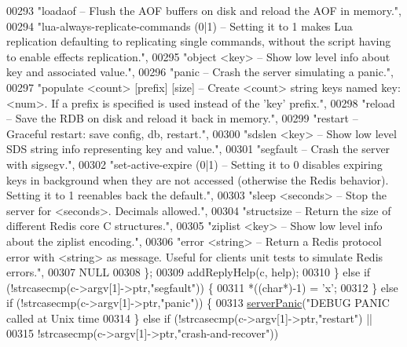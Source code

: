 \begin{DoxyCode}
{{{00293 \textcolor{stringliteral}{"loadaof -- Flush the AOF buffers on disk and reload the AOF in memory."},
00294 \textcolor{stringliteral}{"lua-always-replicate-commands (0|1) -- Setting it to 1 makes Lua replication defaulting to
       replicating single commands, without the script having to enable effects replication."},
00295 \textcolor{stringliteral}{"object <key> -- Show low level info about key and associated value."},
00296 \textcolor{stringliteral}{"panic -- Crash the server simulating a panic."},
00297 \textcolor{stringliteral}{"populate <count> [prefix] [size] -- Create <count> string keys named key:<num>. If a prefix is
       specified is used instead of the 'key' prefix."},
00298 \textcolor{stringliteral}{"reload -- Save the RDB on disk and reload it back in memory."},
00299 \textcolor{stringliteral}{"restart -- Graceful restart: save config, db, restart."},
00300 \textcolor{stringliteral}{"sdslen <key> -- Show low level SDS string info representing key and value."},
00301 \textcolor{stringliteral}{"segfault -- Crash the server with sigsegv."},
00302 \textcolor{stringliteral}{"set-active-expire (0|1) -- Setting it to 0 disables expiring keys in background when they are not
       accessed (otherwise the Redis behavior). Setting it to 1 reenables back the default."},
00303 \textcolor{stringliteral}{"sleep <seconds> -- Stop the server for <seconds>. Decimals allowed."},
00304 \textcolor{stringliteral}{"structsize -- Return the size of different Redis core C structures."},
00305 \textcolor{stringliteral}{"ziplist <key> -- Show low level info about the ziplist encoding."},
00306 \textcolor{stringliteral}{"error <string> -- Return a Redis protocol error with <string> as message. Useful for clients unit
       tests to simulate Redis errors."},
00307 NULL
00308         \};
00309         addReplyHelp(c, help);
00310     \} \textcolor{keywordflow}{else} \textcolor{keywordflow}{if} (!strcasecmp(c->argv[1]->ptr,\textcolor{stringliteral}{"segfault"})) \{
00311         *((\textcolor{keywordtype}{char}*)-1) = \textcolor{stringliteral}{'x'};
00312     \} \textcolor{keywordflow}{else} \textcolor{keywordflow}{if} (!strcasecmp(c->argv[1]->ptr,\textcolor{stringliteral}{"panic"})) \{
00313         \hyperlink{server_8h_a11cc378e7778a830b41240578de3b204}{serverPanic}(\textcolor{stringliteral}{"DEBUG PANIC called at Unix time %
00314     \} \textcolor{keywordflow}{else} \textcolor{keywordflow}{if} (!strcasecmp(c->argv[1]->ptr,\textcolor{stringliteral}{"restart"}) ||
00315                !strcasecmp(c->argv[1]->ptr,\textcolor{stringliteral}{"crash-and-recover"}))
}}}}
\end{DoxyCode}
